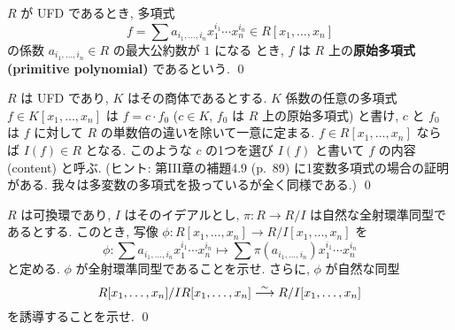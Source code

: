 \documentclass[12pt,twoside]{jarticle}
\begin{document}
\begin{definition}[原始多項式]
  $R$ が UFD であるとき, 多項式
  \begin{equation*}
    f = \sum a_{i_1,\ldots,i_n} x_1^{i_1}\cdots x_n^{i_n}
    \in R[x_1,\ldots,x_n]
  \end{equation*}
  の係数 $a_{i_1,\ldots,i_n}\in R$ の最大公約数が $1$ になる
  とき, $f$ は $R$ 上の{\bf 原始多項式 (primitive polynomial)} であるという.
  \qed
\end{definition}

\begin{question}[多項式の内容]\label{q:content-of-polynomial}
  $R$ は UFD であり, $K$ はその商体であるとする.
  $K$ 係数の任意の多項式 $f\in K[x_1,\ldots,x_n]$ は %
  $f = c\cdot f_0$ ($c\in K$, $f_0$ は $R$ 上の原始多項式) と書け,
  $c$ と $f_0$ は $f$ に対して $R$ の単数倍の違いを除いて一意に定まる.
  $f\in R[x_1,\ldots,x_n]$ ならば $I(f)\in R$ となる.
  このような $c$ の1つを選び $I(f)$ と書いて $f$ の内容 (content) と呼ぶ.
  (ヒント: \cite{morita} 第III章の補題4.9 (p.~89) に1変数多項式の場合の証明
  がある.  我々は多変数の多項式を扱っているが全く同様である.) 
  \qed
\end{question}

\begin{question}\label{q:pre-Gauss-lemma}
  $R$ は可換環であり, $I$ はそのイデアルとし,
  $\pi:R\to R/I$ は自然な全射環準同型であるとする.
  このとき, 写像 $\phi:R[x_1,\ldots,x_n]\to R/I[x_1,\ldots,x_n]$ を
  \begin{equation*}
    \phi : \sum a_{i_1,\ldots,i_n} x_1^{i_1}\cdots x_n^{i_n}
    \mapsto \sum \pi(a_{i_1,\ldots,i_n}) x_1^{i_1}\cdots x_n^{i_n}
  \end{equation*}
  と定める. $\phi$ が全射環準同型であることを示せ. 
  さらに, $\phi$ が自然な同型
  \begin{equation*}
    R[x_1,\ldots,x_n]/IR[x_1,\ldots,x_n] \overset\sim\longrightarrow R/I[x_1,\ldots,x_n]
  \end{equation*}
  を誘導することを示せ.  \qed
\end{question}
\end{document}
